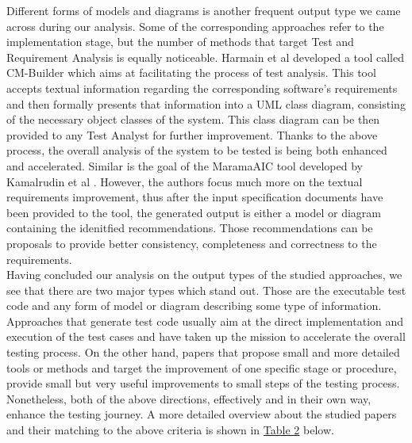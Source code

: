 Different forms of models and diagrams is another frequent output type we came across during our analysis. Some of the corresponding approaches refer to the implementation stage, but the number of methods 
that target Test and Requirement Analysis is equally noticeable. Harmain et al \cite{harmain2000cm} developed a tool called CM-Builder which aims at facilitating the process of test analysis. This tool 
accepts textual information regarding the corresponding software's requirements and then formally presents that information into a UML class diagram, consisting of the necessary object classes of the system. 
This class diagram can be then provided to any Test Analyst for further improvement. Thanks to the above process, the overall analysis of the system to be tested is being both enhanced and accelerated. 
Similar is the goal of the MaramaAIC tool developed by Kamalrudin et al \cite{kamalrudin2017maramaaic}. However, the authors focus much more on the textual requirements improvement, thus after the input 
specification documents have been provided to the tool, the generated output is either a model or diagram containing the idenitfied recommendations. Those recommendations can be proposals to provide better consistency, 
completeness and correctness to the requirements.\\

Having concluded our analysis on the output types of the studied approaches, we see that there are two major types which stand out. Those are the executable test code and any form of model or diagram describing 
some type of information. Approaches that generate test code usually aim at the direct implementation and execution of the test cases and have taken up the mission to accelerate the overall testing process. On the 
other hand, papers that propose small and more detailed tools or methods and target the improvement of one specific stage or procedure, provide small but very useful improvements to small steps of the testing process. 
Nonetheless, both of the above directions, effectively and in their own way, enhance the testing journey. A more detailed overview about the studied papers and their matching to 
the above criteria is shown in \hyperref[table2]{Table 2} below.

